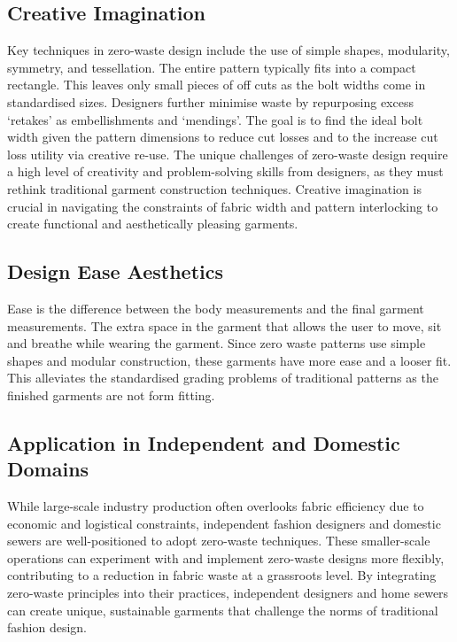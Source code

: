 \subsection{Creative Imagination}
Key techniques in zero-waste design include the use of simple shapes, modularity, symmetry, and tessellation. The entire pattern typically fits into a compact rectangle. This leaves only small pieces of off cuts as the bolt widths come in standardised sizes. Designers further minimise waste by repurposing excess ‘retakes’ as embellishments and ‘mendings’. The goal is to find the ideal bolt width given the pattern dimensions to reduce cut losses and to the increase cut loss utility via creative re-use.
The unique challenges of zero-waste design require a high level of creativity and problem-solving skills from designers, as they must rethink traditional garment construction techniques. Creative imagination is crucial in navigating the constraints of fabric width and pattern interlocking to create functional and aesthetically pleasing garments.

\subsection{Design Ease Aesthetics}
Ease is the difference between the body measurements and the final garment measurements. The extra space in the garment that allows the user to move, sit and breathe while wearing the garment. Since zero waste patterns use simple shapes and modular construction, these garments have more ease and a looser fit. This alleviates the standardised grading problems of traditional patterns as the finished garments are not form fitting.

\subsection{Application in Independent and Domestic Domains}
While large-scale industry production often overlooks fabric efficiency due to economic and logistical constraints, independent fashion designers and domestic sewers are well-positioned to adopt zero-waste techniques. These smaller-scale operations can experiment with and implement zero-waste designs more flexibly, contributing to a reduction in fabric waste at a grassroots level. By integrating zero-waste principles into their practices, independent designers and home sewers can create unique, sustainable garments that challenge the norms of traditional fashion design.



